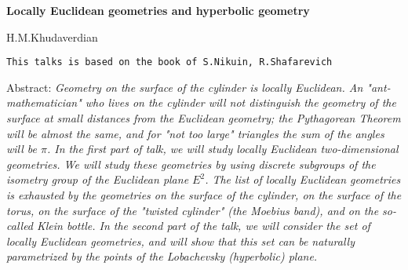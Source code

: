 


\baselineskip=14pt
\def\vare {\varepsilon}
\def\AA {{\bf A}}
\def\A {{\cal A}}
\def\t {\tilde}
\def\bs {{\bf s}}
\def\a {\alpha}
\def\d {\delta}
\def\K {{\bf K}}
\def\N {{\bf N}}
\def\w {\omega}
\def\s {{\sigma}}
\def\S {{\Sigma}}
\def\s {{\sigma}}
\def\p{\partial}
\def\vare{{\varepsilon}}
\def\Q {{\bf Q}}
\def\D {{\cal D}}
\def\B {{\cal B}}
\def\G {{\Gamma}}
\def\C {{\bf C}}
\def\L {{\cal L}}
\def\F {{\cal F}}
\def\Z {{\bf Z}}
\def\U  {{\cal U}}
\def\H {{\bf H}}
\def\S  {{\bf S}}
\def\E  {{\bf E}}
\def\l {\lambda}
\def\degree {{\bf {\rm degree}\,\,}}
\def \finish {${\,\,\vrule height1mm depth2mm width 8pt}$}
\def \m {\medskip}
\def\p {\partial}
\def\r {{\bf r}}
\def\pt {{\bf pt}}
\def\v {{\bf v}}
\def\n {{\bf n}}
\def\t {{\bf t}}
\def\b {{\bf b}}
\def\c {{\bf c }}
\def\e{{\bf e}}
\def\ac {{\bf a}}
\def \X   {{\bf X}}
\def \Y   {{\bf Y}}
\def \x   {{\bf x}}
\def \y   {{\bf y}}
\def\ss  {\sigma_{\rm sph}}
\def \grad {{\rm grad\,}}
\def\e {{\bf e}}
\def\f {{\bf f}}
\def\g {{\bf g}}



  \centerline    {\bf Locally Euclidean geometries and 
       hyperbolic geometry}

  \centerline {H.M.Khudaverdian}

{\tt This talks is based on the book of S.Nikuin, R.Shafarevich}

\medskip

Abstract: {\it Geometry on the surface of the cylinder is 
locally Euclidean. An "ant-mathematician" who lives 
on the cylinder will not  distinguish the geometry of  
the surface at small distances from the Euclidean  
geometry; the Pythagorean Theorem will be almost the same, 
and for "not too large" triangles the sum of the angles will
 be $\pi$.
      In the first part of talk, we will study locally 
Euclidean two-dimensional geometries. We will study  
these geometries by using discrete subgroups of the 
isometry group of the Euclidean 
plane $E^2$. The list of locally Euclidean geometries is 
exhausted by the geometries  on the surface of the cylinder, 
on the surface of the torus, on the surface of the 
"twisted cylinder" (the Moebius band), 
and on the so-called Klein bottle.
         In the second part of the talk, we will 
consider the set of locally Euclidean  geometries, 
and will show that this set can be naturally 
parametrized by the points of the Lobachevsky 
(hyperbolic) plane.
}


